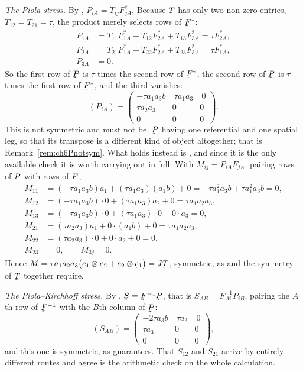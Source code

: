 \begin{solution}
\medskip
\noindent\emph{The Piola stress.}
By , $P_{iA}=T_{ij}F^{*}_{jA}$. Because $\bT$ has only two
non-zero entries, $T_{12}=T_{21}=\tau$, the product merely selects
rows of $\bF^{*}$:
\[
\begin{aligned}
   P_{1A}&=T_{11}F^{*}_{1A}+T_{12}F^{*}_{2A}+T_{13}F^{*}_{3A}
    =\tau F^{*}_{2A},\\
   P_{2A}&=T_{21}F^{*}_{1A}+T_{22}F^{*}_{2A}+T_{23}F^{*}_{3A}
    =\tau F^{*}_{1A},\\
   P_{3A}&=0 .
\end{aligned}
\]
So the first row of $\bP$ is $\tau$ times the second row of $\bF^{*}$,
the second row of $\bP$ is $\tau$ times the first row of $\bF^{*}$, and
the third vanishes:
\[
   \boxed{\;(P_{iA})=\begin{pmatrix}
   -\tau a_{1}a_{3}b&\ \tau a_{1}a_{3}&\ 0\\
   \tau a_{2}a_{3}&0&0\\ 0&0&0\end{pmatrix}.\;}
\]
This is not symmetric and must not be, $\bP$ having one referential and
one spatial leg, so that its transpose is a different kind of object
altogether; that is Remark~\ref{rem:ch6Pnotsym}. What holds instead is
, and since it is the only available check it is worth
carrying out in full. With $M_{ij}=P_{iA}F_{jA}$, pairing rows of $\bP$
with rows of $\bF$,
\[
\begin{aligned}
   M_{11}&=(-\tau a_{1}a_{3}b)a_{1}+(\tau a_{1}a_{3})(a_{1}b)+0
     =-\tau a_{1}^{2}a_{3}b+\tau a_{1}^{2}a_{3}b=0,\\
   M_{12}&=(-\tau a_{1}a_{3}b)\cdot0+(\tau a_{1}a_{3})a_{2}+0
     =\tau a_{1}a_{2}a_{3},\\
   M_{13}&=(-\tau a_{1}a_{3}b)\cdot0+(\tau a_{1}a_{3})\cdot0
     +0\cdot a_{3}=0,\\
   M_{21}&=(\tau a_{2}a_{3})a_{1}+0\cdot(a_{1}b)+0
     =\tau a_{1}a_{2}a_{3},\\
   M_{22}&=(\tau a_{2}a_{3})\cdot0+0\cdot a_{2}+0=0,\\
   M_{23}&=0,\qquad M_{3j}=0 .
\end{aligned}
\]
Hence $\bM=\tau a_{1}a_{2}a_{3}\big(\be_{1}\otimes\be_{2}
+\be_{2}\otimes\be_{1}\big)=J\bT$, symmetric, as  and the
symmetry of $\bT$ together require.

\medskip
\noindent\emph{The Piola--Kirchhoff stress.}
By , $\bS=\bF^{-1}\bP$, that is
$S_{AB}=F^{-1}_{Ai}P_{iB}$, pairing the $A$th row of $\bF^{-1}$ with
the $B$th column of $\bP$:
\[
   \boxed{\;(S_{AB})=\begin{pmatrix}
   -2\tau a_{3}b&\ \tau a_{3}&\ 0\\
   \tau a_{3}&0&0\\ 0&0&0\end{pmatrix},\;}
\]
and this one is symmetric, as  guarantees. That $S_{12}$ and
$S_{21}$ arrive by entirely different routes and agree is the
arithmetic check on the whole calculation.


\end{solution}
